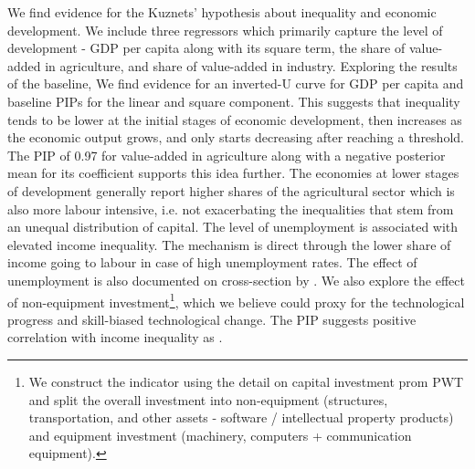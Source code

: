 \documentclass[preprint, nonatbib, 10pt]{elsarticle}
\begin{document}
  We find evidence for the Kuznets' hypothesis about inequality and economic development. We include three regressors which primarily capture the level of development - GDP per capita along with its square term, the share of value-added in agriculture, and share of value-added in industry. Exploring the results of the baseline, We find evidence for an inverted-U curve for GDP per capita and baseline \acp{PIP} for the linear and square component. This suggests that inequality tends to be lower at the initial stages of economic development, then increases as the economic output grows, and only starts decreasing after reaching a threshold. The \ac{PIP} of 0.97 for value-added in agriculture along with a negative posterior mean for its coefficient supports this idea further. The economies at lower stages of development generally report higher shares of the agricultural sector which is also more labour intensive, i.e. not exacerbating the inequalities that stem from an unequal distribution of capital. The level of unemployment is associated with elevated income inequality. The mechanism is direct through the lower share of income going to labour in case of high unemployment rates. The effect of unemployment is also documented on cross-section by \textcite{furceri2019robust}. We also explore the effect of non-equipment investment\footnote{We construct the indicator using the detail on capital investment prom \ac{PWT} and split the overall investment into non-equipment (structures, transportation, and other assets - software / intellectual property products) and equipment investment (machinery, computers + communication equipment).}, which we believe could proxy for the technological progress and skill-biased technological change. The \ac{PIP} suggests positive correlation with income inequality as \textcite{goldin2009race,dabla2015causes}.
\end{document}
